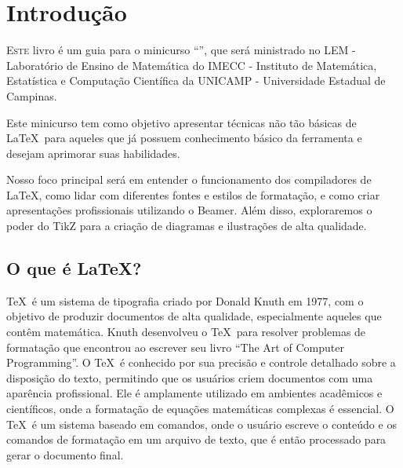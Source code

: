 \chapter{Introdução}


\lettrine{E}{ste} livro é um guia para o minicurso ``\booktitle'', que será ministrado no LEM - Laboratório de Ensino de Matemática do IMECC - Instituto de Matemática, Estatística e Computação Científica da UNICAMP - Universidade Estadual de Campinas.

Este minicurso tem como objetivo apresentar técnicas não tão básicas de \LaTeX\ para aqueles que já possuem conhecimento básico da ferramenta e desejam aprimorar suas habilidades.

Nosso foco principal será em entender o funcionamento dos compiladores de \LaTeX, como lidar com diferentes fontes e estilos de formatação, e como criar apresentações profissionais utilizando o Beamer. Além disso, exploraremos o poder do TikZ para a criação de diagramas e ilustrações de alta qualidade.


\section{O que é \LaTeX?}


\TeX\ é um sistema de tipografia criado por Donald Knuth em 1977, com o objetivo de produzir documentos de alta qualidade, especialmente aqueles que contêm matemática. Knuth desenvolveu o \TeX\ para resolver problemas de formatação que encontrou ao escrever seu livro ``The Art of Computer Programming''. O \TeX\ é conhecido por sua precisão e controle detalhado sobre a disposição do texto, permitindo que os usuários criem documentos com uma aparência profissional. Ele é amplamente utilizado em ambientes acadêmicos e científicos, onde a formatação de equações matemáticas complexas é essencial. O \TeX\ é um sistema baseado em comandos, onde o usuário escreve o conteúdo e os comandos de formatação em um arquivo de texto, que é então processado para gerar o documento final.

